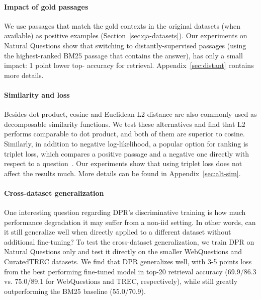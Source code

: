 \documentclass[11pt,a4paper]{article}
\def\model/{DPR}
\begin{document}
\paragraph{Impact of gold passages} \label{sec:pos_pass}
We use passages that match the gold contexts in the original datasets (when available) as positive examples (Section~\ref{sec:qa-datasets}).
Our experiments on Natural Questions show that switching to distantly-supervised passages (using the highest-ranked BM25 passage that contains the answer), has only a small impact: 1 point lower top- accuracy for retrieval. Appendix~\ref{sec:distant} contains more details.



\paragraph{Similarity and loss}
\label{sec:sim_loss}
Besides dot product, cosine and Euclidean L2 distance are also commonly used as decomposable similarity functions.
We test these alternatives and find that L2 performs comparable to dot product, and both of them are superior to cosine.
Similarly, in addition to negative log-likelihood, a popular option for ranking is triplet loss, which compares a positive passage and a negative one directly with respect to a question~\cite{burges2005learning}.
Our experiments show that using triplet loss does not affect the results much.
More details can be found in Appendix~\ref{sec:alt-sim}. 


\paragraph{Cross-dataset generalization}
One interesting question regarding \model/'s discriminative training is how much performance degradation it may suffer from a non-iid setting. In other words, can it still generalize well when directly applied to a different dataset without additional fine-tuning? To test the cross-dataset generalization, we train \model/ on Natural Questions only and test it directly on the smaller WebQuestions and CuratedTREC datasets. We find that \model/ generalizes well, with 3-5 points loss from the best performing fine-tuned model in top-20 retrieval accuracy (69.9/86.3 vs. 75.0/89.1 for WebQuestions and TREC, respectively), while still greatly outperforming the BM25 baseline (55.0/70.9).
\end{document}
